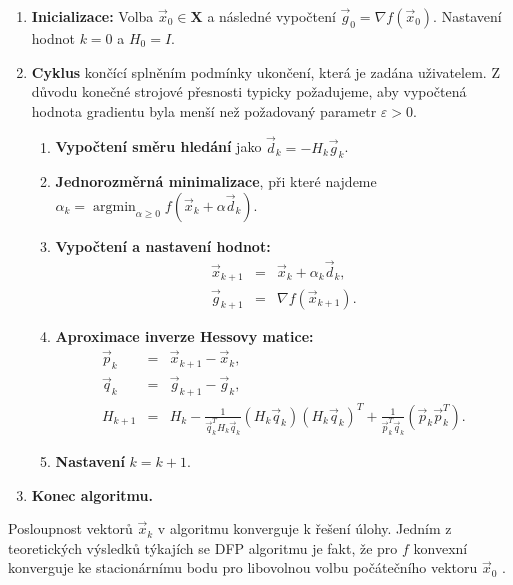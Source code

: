 \begin{enumerate}
	\item \textbf{Inicializace:} Volba $ \vec{x}_0 \in \mathbf{X}$ a následné vypočtení $ \vec{g}_0 = \nabla f (\vec{x}_0) $. Nastavení hodnot $ k=0 $ a $ H_0 = I $.
	\item \textbf{Cyklus} končící splněním podmínky ukončení, která je zadána uživatelem. Z důvodu konečné strojové přesnosti typicky požadujeme, aby vypočtená hodnota gradientu byla menší než požadovaný parametr $ \varepsilon > 0$.
	\begin{enumerate}
		\item \textbf{Vypočtení směru hledání} jako $ \vec{d}_k = -H_k \vec{g}_k $.
		\item \textbf{Jednorozměrná minimalizace}, při které najdeme $ \alpha_k = \operatorname*{argmin}_{\alpha \geq 0} f (\vec{x}_k + \alpha \vec{d}_k)$.
		\item \textbf{Vypočtení a nastavení hodnot:}
		\begin{subequations}
			\begin{eqnarray}
			\vec{x}_{k+1} &=& \vec{x}_k + \alpha_k \vec{d}_k,\\[3pt]
			\vec{g}_{k+1} &=& \nabla f({\vec{x}_{k+1}}).
			\end{eqnarray}
		\end{subequations}
		\item \textbf{Aproximace inverze Hessovy matice:} 
		\begin{subequations}
			\begin{eqnarray}
			\vec{p}_{k} &=& \vec{x}_{k+1} - \vec{x}_{k},\\[3pt]
			\vec{q}_{k} &=& \vec{g}_{k+1} - \vec{g}_{k},\\[3pt]\label{eq:hessian}
			H_{k+1} &=& H_k - \frac{1}{\vec{q}^T_k H_k \vec{q}^{}_k} (H_k \vec{q}^{}_k)(H_k \vec{q}^{}_k)^T + \frac{1}{\vec{p}^T_k \vec{q}^{}_k} (\vec{p}^{}_k \vec{p}^{T}_k).
			\end{eqnarray}
		\end{subequations}
		\item \textbf{Nastavení} $ k = k + 1 $.
	\end{enumerate}
	\item \textbf{Konec algoritmu.}
\end{enumerate}
Posloupnost vektorů $ \vec{x}_k $ v algoritmu konverguje k řešení úlohy. Jedním z teoretických výsledků týkajích se DFP algoritmu je fakt, že pro $ f $ konvexní konverguje ke stacionárnímu bodu pro libovolnou volbu počátečního vektoru $ \vec{x}_0 $ \cite{non-linear-textbook}.

